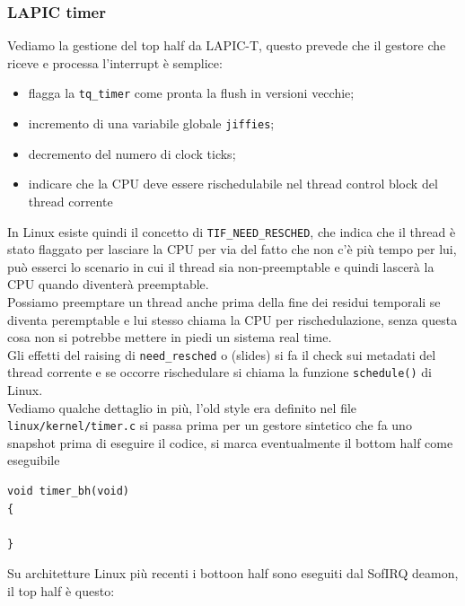 \documentclass[12pt, oneside]{extbook}
\begin{document}
\subsubsection{LAPIC timer}
Vediamo la gestione del top half da LAPIC-T, questo prevede che il gestore che riceve e processa l'interrupt è semplice:
\begin{itemize}
\item flagga la \texttt{tq\_timer} come pronta la flush in versioni vecchie;
\item incremento di una variabile globale \texttt{jiffies};
\item decremento del numero di clock ticks;
\item indicare che la CPU deve essere rischedulabile nel thread control block del thread corrente
\end{itemize}
In Linux esiste quindi il concetto di \texttt{TIF\_NEED\_RESCHED}, che indica che il thread è stato flaggato per lasciare la CPU per via del fatto che non c'è più tempo per lui, può esserci lo scenario in cui il thread sia non-preemptable e quindi lascerà la CPU quando diventerà preemptable.\\Possiamo preemptare un thread anche prima della fine dei residui temporali se diventa peremptable e lui stesso chiama la CPU per rischedulazione, senza questa cosa non si potrebbe mettere in piedi un sistema real time.\\Gli effetti del raising di \texttt{need\_resched} o (slides) si fa il check sui metadati del thread corrente e se occorre rischedulare si chiama la funzione \texttt{schedule()} di Linux.\\Vediamo qualche dettaglio in più, l'old style era definito nel file \texttt{linux/kernel/timer.c}
si passa prima per un gestore sintetico che fa uno snapshot prima di eseguire il codice, si marca eventualmente il bottom half come eseguibile
\begin{lstlisting}
void timer_bh(void)
{
	
}
\end{lstlisting}
Su architetture Linux più recenti i bottoon half sono eseguiti dal SofIRQ deamon, il top half è questo:
\end{document}
